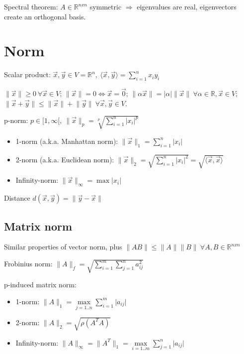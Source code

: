 \documentclass[]{article}
\begin{document}
	Spectral theorem: $A \in \mathbb{R}^{nxn}$ symmetric $\Rightarrow$ eigenvalues are real, eigenvectors create an orthogonal basis.
	
	\section{Norm}
	
	Scalar product: $\vec{x},\vec{y} \in V=\mathbb{R}^n, \ \langle \vec{x},\vec{y} \rangle = \sum\limits_{i=1}^{n} x_i y_i$
	
	$\lVert \vec{x} \rVert \ge 0 \ \forall \vec{x} \in V$;
	$\lVert \vec{x} \rVert=0 \iff \vec{x}=\vec{0}$;	
	$\lVert \alpha \vec{x} \rVert = \lvert \alpha \rvert \lVert \vec{x} \rVert \ \forall \alpha \in \mathbb{R}, \vec{x} \in V$;	
	$\lVert \vec{x}+\vec{y} \rVert \le \lVert \vec{x} \rVert + \lVert \vec{y} \rVert \ \forall \vec{x},\vec{y} \in V$.
	
	p-norm: $p\in [1,\infty[, \ \lVert \vec{x} \rVert_p = \sqrt[p]{\sum_{i=1}^n \lvert x_i \rvert^p}$
	\begin{itemize}
		\item 1-norm (a.k.a. Manhattan norm): $\lVert \vec{x} \rVert_1 = \sum\limits_{i=1}^n \lvert x_i \rvert$
		\item 2-norm (a.k.a. Euclidean norm): $\lVert \vec{x} \rVert_2 = \sqrt{\sum\limits_{i=1}^n \lvert x_i \rvert^2} = \sqrt{\langle \vec{x},\vec{x} \rangle}$
		\item Infinity-norm: $\lVert \vec{x} \rVert_\infty = \max{\lvert x_i \rvert}$
	\end{itemize}

	Distance $d(\vec{x},\vec{y}) = \lVert \vec{y}-\vec{x} \rVert$

	\subsection{Matrix norm}
	
	Similar properties of vector norm, plus $\lVert A B \rVert \le \lVert A \rVert \lVert B \rVert \ \forall A,B\in \mathbb{R}^{nxn}$
	 
	Frobinius norm: $\lVert A \rVert_f = \sqrt{\sum_{i=1}^m \sum_{j=1}^n a_{ij}^2}$
	
	p-induced matrix norm: 
	\begin{itemize}
		\item 1-norm: $\lVert A \rVert_1 = \max\limits_{j=1..n}\sum\limits_{i=1}^m \lvert a_{ij} \rvert$
		\item 2-norm: $\lVert A \rVert_2 = \sqrt{\rho(A^T A)}$
		\item Infinity-norm: $\lVert A \rVert_\infty = \lVert A^T \rVert_1 = \max\limits_{i=1..m}\sum\limits_{j=1}^n \lvert a_{ij} \rvert$
	\end{itemize}
\end{document}
